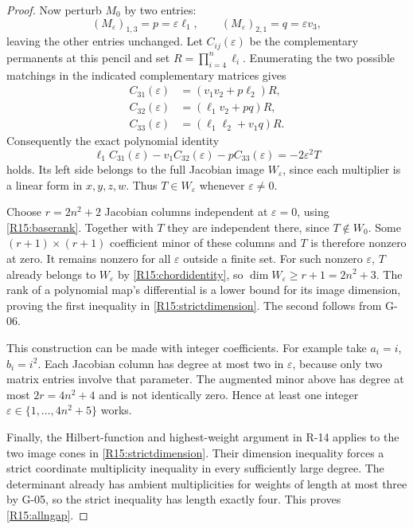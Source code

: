 \begin{proof}
Now perturb $M_0$ by two entries:
\[
 (M_\varepsilon)_{1,3}=p=\varepsilon\ell_1,
 \qquad (M_\varepsilon)_{2,1}=q=\varepsilon v_3,
\]
leaving the other entries unchanged.
Let $C_{ij}(\varepsilon)$ be the complementary permanents at
this pencil and set $R=\prod_{i=4}^n\ell_i$.
Enumerating the two possible matchings in the indicated
complementary matrices gives
\[
 \begin{aligned}
 C_{31}(\varepsilon)&=(v_1v_2+p\ell_2)R,\\
 C_{32}(\varepsilon)&=(\ell_1v_2+pq)R,\\
 C_{33}(\varepsilon)&=(\ell_1\ell_2+v_1q)R.
 \end{aligned}
\]
Consequently the exact polynomial identity
\begin{equation}\label{R15:chordidentity}
 \ell_1C_{31}(\varepsilon)-v_1C_{32}(\varepsilon)
       -pC_{33}(\varepsilon)
       =-2\varepsilon^2T
\end{equation}
holds. Its left side belongs to the full Jacobian image
$W_\varepsilon$, since each multiplier is a linear form in
$x,y,z,w$. Thus $T\in W_\varepsilon$ whenever $\varepsilon\ne0$.

Choose $r=2n^2+2$ Jacobian columns independent at
$\varepsilon=0$, using \eqref{R15:baserank}.
Together with $T$ they are independent there, since
$T\notin W_0$. Some $(r+1)\times(r+1)$ coefficient minor of
these columns and $T$ is therefore nonzero at zero. It remains
nonzero for all $\varepsilon$ outside a finite set. For such
nonzero $\varepsilon$, $T$ already belongs to $W_\varepsilon$
by \eqref{R15:chordidentity}, so
$\dim W_\varepsilon\geq r+1=2n^2+3$.
The rank of a polynomial map's differential is a lower bound
for its image dimension, proving the first inequality in
\eqref{R15:strictdimension}. The second follows from G-06.

This construction can be made with integer coefficients.
For example take $a_i=i$, $b_i=i^2$.
Each Jacobian column has degree at most two in $\varepsilon$,
because only two matrix entries involve that parameter.
The augmented minor above has degree at most $2r=4n^2+4$ and
is not identically zero. Hence at least one integer
$\varepsilon\in\{1,\ldots,4n^2+5\}$ works.

Finally, the Hilbert-function and highest-weight argument in
R-14 applies to the two image cones in
\eqref{R15:strictdimension}. Their dimension inequality forces
a strict coordinate multiplicity inequality in every sufficiently
large degree. The determinant already has ambient multiplicities
for weights of length at most three by G-05, so the strict
inequality has length exactly four. This proves
\eqref{R15:allngap}.
\end{proof}

